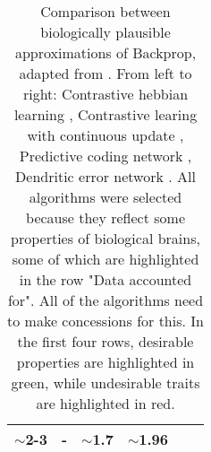\begin{table}[h]
{\begin{tabular}{|ll|ll|ll|}
               \multicolumn{1}{l|}{\cellcolor[HTML]{D9D9D9}$\sim$2-3}                                                   & -
                                                                                                                        & \multicolumn{1}{l|}{\cellcolor[HTML]{D9D9D9}$\sim$1.7} & $\sim$1.96 \\
               \hline
    \end{tabular}
  }\caption[Comparison between biologically plausible approximations of Backprop]{Comparison between biologically
    plausible approximations of Backprop, adapted from \citep{whittington2019theories}. From left to right: Contrastive
    hebbian learning \citep{OReilly1996}, Contrastive learing with continuous update \citep{Bengio2017}, Predictive
    coding network \citep{Whittington2017}, Dendritic error network \citep{sacramento2018dendritic}. All algorithms were
    selected because they reflect some properties of biological brains, some of which are highlighted in the row "Data
    accounted for". All of the algorithms need to make concessions for this. In the first four rows, desirable
    properties are highlighted in green, while undesirable traits are highlighted in red.}\label{tab-wb-models}

\end{table}


